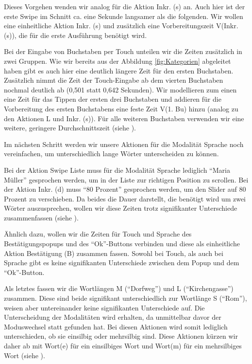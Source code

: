 Dieses Vorgehen wenden wir analog für die Aktion Inkr. (s) an.
Auch hier ist der erste Swipe im Schnitt ca. eine Sekunde langsamer als die folgenden.
Wir wollen eine einheitliche Aktion Inkr. (s) und zusätzlich eine Vorbereitungszeit V(Inkr. (s)), die für die erste Ausführung benötigt wird.
 
Bei der Eingabe von Buchstaben per Touch unteilen wir die Zeiten zusätzlich in zwei Gruppen.
Wie wir bereits aus der Abbildung \ref{fig:Kategorien} abgeleitet haben gibt es auch hier eine deutlich längere Zeit für den ersten Buchstaben.
Zusätzlich nimmt die Zeit der Touch-Eingabe ab dem vierten Buchstaben nochmal deutlich ab (0,501 statt 0,642 Sekunden).
Wir modellieren zum einen eine Zeit für das Tippen der ersten drei Buchstaben und addieren für die Vorbereitung des ersten Buchstabens eine feste Zeit V(1. Bu) hinzu (analog zu den Aktionen L und Inkr. (s)).
Für alle weiteren Buchstaben verwenden wir eine weitere, geringere Durchschnittszeit (siehe ).

Im nächsten Schritt werden wir unsere Aktionen für die Modalität Sprache noch vereinfachen, um unterschiedlich lange Wörter unterscheiden zu können.

Bei der Aktion Swipe Liste muss für die Modalität Sprache lediglich "`Maria Müller"' gesprochen werden, um in der Liste zur richtigen Position zu scrollen.
Bei der Aktion Inkr. (d) muss "`80 Prozent"' gesprochen werden, um den Slider auf 80 Prozent zu verschieben.
Da beides die Dauer darstellt, die benötigt wird um zwei Wörter auszusprechen, wollen wir diese Zeiten trotz signifikanter Unterschiede zusammenfassen (siehe ).

Ähnlich dazu, wollen wir die Zeiten für Touch und Sprache des Bestätigungspopups und des "`Ok"'-Buttons verbinden und diese als einheitliche Aktion Bestätigung (B) zusammen fassen.
Sowohl bei Touch, als auch bei Sprache gibt es keine signifikanten Unterschiede zwischen dem Popup und dem "`Ok"'-Button.

Als letztes fassen wir die Wortlängen M ("`Dorfweg"') und L ("`Kirchengasse"') zusammen.
Diese sind beide signifikant unterschiedlich zur Wortlänge S ("`Rom"'), weisen aber untereinander keine signifikanten Unterschiede auf.
Die Unterscheidung der Modalitäten wird erhalten, da unmittelbar davor der Moduswechsel statt gefunden hat.
Bei diesen Aktionen wird somit lediglich unterschieden, ob sie einsilbig oder mehrsilbig sind.
Diese Aktionen kürzen wir daher ab mit Wort(e) für ein einsilbiges Wort und Wort(m) für ein mehrsilbiges Wort (siehe ).


